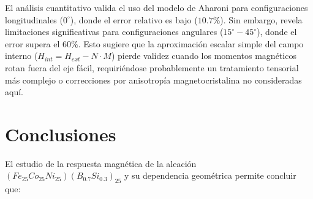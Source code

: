 \begin{table}[h]
    \centering
    \caption{Métricas de error del modelo teórico respecto al experimento.}
    \label{tab:errores_modelo}
\end{table}

El análisis cuantitativo valida el uso del modelo de Aharoni para configuraciones longitudinales ($0^\circ$), donde el error relativo es bajo ($10.7\%$). Sin embargo, revela limitaciones significativas para configuraciones angulares ($15^\circ - 45^\circ$), donde el error supera el $60\%$. Esto sugiere que la aproximación escalar simple del campo interno ($H_{int} = H_{ext} - N \cdot M$) pierde validez cuando los momentos magnéticos rotan fuera del eje fácil, requiriéndose probablemente un tratamiento tensorial más complejo o correcciones por anisotropía magnetocristalina no consideradas aquí.

\section{Conclusiones}

El estudio de la respuesta magnética de la aleación $(Fe_{25}Co_{25}Ni_{25})(B_{0.7}Si_{0.3})_{25}$ y su dependencia geométrica permite concluir que:

